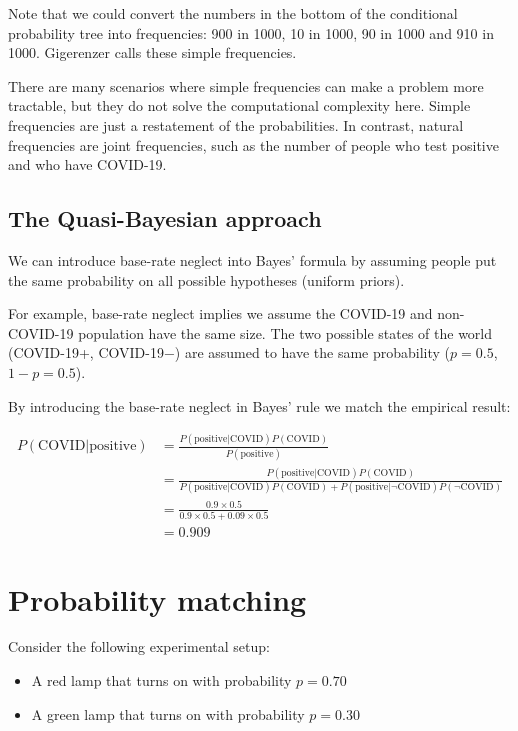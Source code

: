 \documentclass[
  letterpaper,
  DIV=11,
  numbers=noendperiod]{scrreprt}
\providecommand{\tightlist}{%
  \setlength{\itemsep}{0pt}\setlength{\parskip}{0pt}}\usepackage{longtable,booktabs,array}
\begin{document}
Note that we could convert the numbers in the bottom of the conditional
probability tree into frequencies: 900 in 1000, 10 in 1000, 90 in 1000
and 910 in 1000. Gigerenzer calls these simple frequencies.

There are many scenarios where simple frequencies can make a problem
more tractable, but they do not solve the computational complexity here.
Simple frequencies are just a restatement of the probabilities. In
contrast, natural frequencies are joint frequencies, such as the number
of people who test positive and who have COVID-19.

\hypertarget{the-quasi-bayesian-approach}{%
\subsection{The Quasi-Bayesian
approach}\label{the-quasi-bayesian-approach}}

We can introduce base-rate neglect into Bayes' formula by assuming
people put the same probability on all possible hypotheses (uniform
priors).

For example, base-rate neglect implies we assume the COVID-19 and
non-COVID-19 population have the same size. The two possible states of
the world (COVID-19+, COVID-19−) are assumed to have the same
probability (\(p=0.5\), \(1−p=0.5\)).

By introducing the base-rate neglect in Bayes' rule we match the
empirical result:

\begin{align*}
P(\text{COVID}|\text{positive})&=\frac{P(\text{positive}|\text{COVID})P(\text{COVID})}{P(\text{positive})} \\[12pt]
&=\frac{P(\text{positive}|\text{COVID})P(\text{COVID})}{P(\text{positive}|\text{COVID})P(\text{COVID})+P(\text{positive}|\neg\text{COVID})P(\neg\text{COVID})} \\[12pt]
&=\frac{0.9\times 0.5}{0.9\times 0.5 + 0.09\times 0.5} \\[12pt]
&=0.909
\end{align*}

\hypertarget{probability-matching}{%
\section{Probability matching}\label{probability-matching}}

Consider the following experimental setup:

\begin{itemize}
\tightlist
\item
  A red lamp that turns on with probability \(p=0.70\)
\item
  A green lamp that turns on with probability \(p=0.30\)
\end{itemize}
\end{document}
